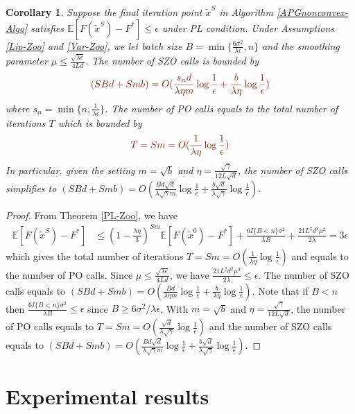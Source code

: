 \documentclass{article}
\newcommand*{\E}{\mathbb{E}}
\newtheorem{corollary}[theorem]{Corollary}
\theoremstyle{definition}
\theoremstyle{remark}
\begin{document}
\begin{corollary}\label{PL-Zo-Cor-rand}
Suppose the final iteration point $\tilde{x}^S$ in Algorithm \ref{APGnonconvex-Algo} satisfies $\E[F(\tilde{x}^S) - F^*]\leq \epsilon$ under PL condition. Under Assumptions \ref{Lip-Zoo} and \ref{Var-Zoo}, we let batch size $B = \min\{\frac{6\sigma^2}{\lambda\epsilon},n\}$ and the smoothing parameter $\mu \leq \frac{\sqrt{\lambda\epsilon}}{4 L d}$. The number of SZO calls is bounded by
\[
{\color{Brown}(SBd+Smb) = O(\frac{s_n d}{\lambda\eta m}\log\frac{1}{\epsilon}+\frac{b }{\lambda\eta}\log\frac{1}{\epsilon})}
\]
where $s_n = \min \{n,\frac{1}{\lambda \epsilon}\}$.
The number of PO calls equals to the total number of iterations $T$ which is bounded by
\[
{\color{Brown} T = Sm = O(\frac{1}{\lambda\eta}\log\frac{1}{\epsilon})}
\]
In particular, given the setting  $m=\sqrt{b}$ and {\color{blue}$\eta = \frac{\sqrt{\gamma}}{12 L\sqrt{d}}$}, the number of SZO calls  simplifies to 
{\color{blue}$(SBd+Smb) = O(\frac{Bd\sqrt{d}}{\lambda\sqrt{\gamma} m}\log\frac{1}{\epsilon}+\frac{b\sqrt{d}}{\lambda\sqrt{\gamma}}\log\frac{1}{\epsilon})$.}
\end{corollary}
\begin{proof}
From Theorem \ref{PL-Zoo}, we have
\begin{align}
\E[F(\tilde{x}^S) - {F}^*] & \leq   \left(1-\frac{\lambda\eta}{3}\right)^{Sm} \E[F(\tilde{x}^0) - {F}^*] + \frac{6I\{B < n\} \sigma ^2}{\lambda B}+\frac{21 L^2 d^2 \mu^2}{2\lambda}= 3 \epsilon
\end{align}
which gives the total number of iterations {\color{Brown} $T = Sm = O(\frac{1}{\lambda\eta}\log\frac{1}{\epsilon})$} and equals to the number of PO calls. Since $\mu \leq \frac{\sqrt{\lambda\epsilon}}{4 L d}$, we have $\frac{21 L^2 d^2 \mu^2}{2\lambda} \leq \epsilon$. The number of SZO calls equals to {\color{Brown}$(SBd+Smb) = O(\frac{Bd}{\lambda\eta m}\log\frac{1}{\epsilon}+\frac{b}{\lambda\eta}\log\frac{1}{\epsilon})$}.  Note that if $B < n$ then $\frac{6I\{B < n\} \sigma ^2}{\lambda B} \leq \epsilon$ since $B \geq 6 {\sigma ^2}/{\lambda \epsilon}$. With $m=\sqrt{b}$ and $\eta = \frac{\sqrt{\gamma}}{12 L\sqrt{d}}$, the number of PO calls equals to {\color{Blue} $T = Sm = O(\frac{\sqrt{d}}{\lambda\sqrt{\gamma}}\log\frac{1}{\epsilon})$} and the number of SZO calls equals to {\color{blue}$(SBd+Smb) = O(\frac{Bd\sqrt{d}}{\lambda\sqrt{\gamma} m}\log\frac{1}{\epsilon}+\frac{b\sqrt{d}}{\lambda\sqrt{\gamma}}\log\frac{1}{\epsilon})$}.
\end{proof}
\section{Experimental results}
\end{document}
